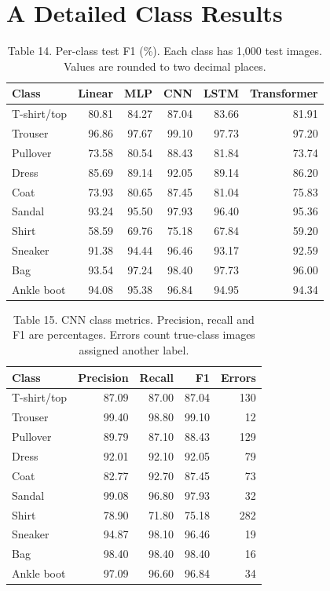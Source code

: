 \section{A Detailed Class Results}
\label{app:class}
\begin{table}[H]\centering
\caption{Table 14. Per-class test F1 (\%). Each class has 1,000 test images.
Values are rounded to two decimal places.}
\begin{tabular}{lrrrrr}\toprule
Class & Linear & MLP & CNN & LSTM & Transformer\\\midrule
T-shirt/top & 80.81 & 84.27 & 87.04 & 83.66 & 81.91\\
Trouser & 96.86 & 97.67 & 99.10 & 97.73 & 97.20\\
Pullover & 73.58 & 80.54 & 88.43 & 81.84 & 73.74\\
Dress & 85.69 & 89.14 & 92.05 & 89.14 & 86.20\\
Coat & 73.93 & 80.65 & 87.45 & 81.04 & 75.83\\
Sandal & 93.24 & 95.50 & 97.93 & 96.40 & 95.36\\
Shirt & 58.59 & 69.76 & 75.18 & 67.84 & 59.20\\
Sneaker & 91.38 & 94.44 & 96.46 & 93.17 & 92.59\\
Bag & 93.54 & 97.24 & 98.40 & 97.73 & 96.00\\
Ankle boot & 94.08 & 95.38 & 96.84 & 94.95 & 94.34\\

\bottomrule\end{tabular}
\end{table}

\begin{table}[H]\centering
\caption{Table 15. CNN class metrics. Precision, recall and F1 are percentages.
Errors count true-class images assigned another label.}
\begin{tabular}{lrrrr}\toprule
Class & Precision & Recall & F1 & Errors\\\midrule
T-shirt/top & 87.09 & 87.00 & 87.04 & 130\\
Trouser & 99.40 & 98.80 & 99.10 & 12\\
Pullover & 89.79 & 87.10 & 88.43 & 129\\
Dress & 92.01 & 92.10 & 92.05 & 79\\
Coat & 82.77 & 92.70 & 87.45 & 73\\
Sandal & 99.08 & 96.80 & 97.93 & 32\\
Shirt & 78.90 & 71.80 & 75.18 & 282\\
Sneaker & 94.87 & 98.10 & 96.46 & 19\\
Bag & 98.40 & 98.40 & 98.40 & 16\\
Ankle boot & 97.09 & 96.60 & 96.84 & 34\\

\bottomrule\end{tabular}
\end{table}

